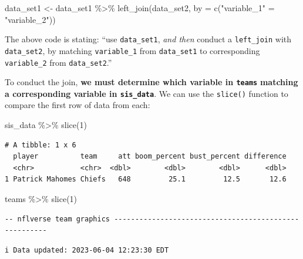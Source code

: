 \documentclass[
  letterpaper,
]{krantz}
\newenvironment{Shaded}{\begin{snugshade}}{\end{snugshade}}
\newcommand{\AttributeTok}[1]{\textcolor[rgb]{0.40,0.45,0.13}{#1}}
\newcommand{\DecValTok}[1]{\textcolor[rgb]{0.68,0.00,0.00}{#1}}
\newcommand{\FunctionTok}[1]{\textcolor[rgb]{0.28,0.35,0.67}{#1}}
\newcommand{\NormalTok}[1]{\textcolor[rgb]{0.00,0.23,0.31}{#1}}
\newcommand{\OtherTok}[1]{\textcolor[rgb]{0.00,0.23,0.31}{#1}}
\newcommand{\SpecialCharTok}[1]{\textcolor[rgb]{0.37,0.37,0.37}{#1}}
\newcommand{\StringTok}[1]{\textcolor[rgb]{0.13,0.47,0.30}{#1}}
\begin{document}
\begin{Shaded}
\begin{Highlighting}[]
\NormalTok{data\_set1 }\OtherTok{\textless{}{-}}\NormalTok{ data\_set1 }\SpecialCharTok{\%\textgreater{}\%}
  \FunctionTok{left\_join}\NormalTok{(data\_set2, }\AttributeTok{by =} \FunctionTok{c}\NormalTok{(}\StringTok{"variable\_1"} \OtherTok{=} \StringTok{"variable\_2"}\NormalTok{))}
\end{Highlighting}
\end{Shaded}

The above code is stating: ``use \texttt{data\_set1}, \emph{and then}
conduct a \texttt{left\_join} with \texttt{data\_set2}, by matching
\texttt{variable\_1} from \texttt{data\_set1} to corresponding
\texttt{variable\_2} from \texttt{data\_set2}.''

To conduct the join, \textbf{we must determine which variable in
\texttt{teams}} \textbf{matching a corresponding variable in
\texttt{sis\_data}}. We can use the \texttt{slice()} function to compare
the first row of data from each:

\begin{Shaded}
\begin{Highlighting}[]
\NormalTok{sis\_data }\SpecialCharTok{\%\textgreater{}\%}
  \FunctionTok{slice}\NormalTok{(}\DecValTok{1}\NormalTok{)}
\end{Highlighting}
\end{Shaded}

\begin{verbatim}
# A tibble: 1 x 6
  player          team     att boom_percent bust_percent difference
  <chr>           <chr>  <dbl>        <dbl>        <dbl>      <dbl>
1 Patrick Mahomes Chiefs   648         25.1         12.5       12.6
\end{verbatim}

\begin{Shaded}
\begin{Highlighting}[]
\NormalTok{teams }\SpecialCharTok{\%\textgreater{}\%}
  \FunctionTok{slice}\NormalTok{(}\DecValTok{1}\NormalTok{)}
\end{Highlighting}
\end{Shaded}

\begin{verbatim}
-- nflverse team graphics ------------------------------------------------------
\end{verbatim}

\begin{verbatim}
i Data updated: 2023-06-04 12:23:30 EDT
\end{verbatim}
\end{document}
